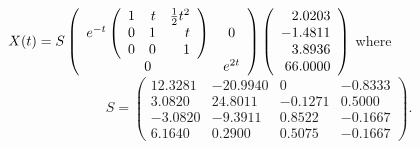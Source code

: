 \ans $X(t) = S
\left(\begin{array}{cc} e^{-t}\left(\begin{array}{rrr}
     1  &  t   &   \frac{1}{2}t^2\\
    0   &  1   &   t\\
    0   &  0   &   1 \end{array}\right) & 0\\ 0 &e^{2t}\end{array}\right)
\left(\begin{array}{r} 2.0203\\ -1.4811 \\ 3.8936\\ 66.0000
\end{array}\right)$ where
\[
S = \left(\begin{array}{rrrr}
   12.3281 & -20.9940 &        0 &  -0.8333\\
    3.0820 &  24.8011 &  -0.1271 &   0.5000\\
   -3.0820 &  -9.3911 &   0.8522 &  -0.1667\\
    6.1640 &   0.2900 &   0.5075 &  -0.1667 \end{array}\right).
\]

\vspace{0.08in}


